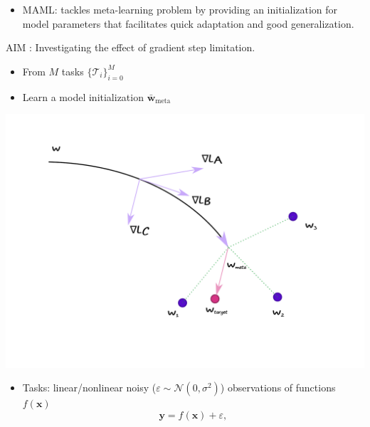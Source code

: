 \documentclass[a0paper,portrait]{baposter}
\begin{document}
\begin{poster}
{\begin{itemize}
    \color{Pink}\item \color{Black} MAML: tackles meta-learning problem by providing an initialization for model parameters that facilitates quick adaptation and good generalization.
  \end{itemize}
  \centering 
  \color{Pink} AIM : \color{Black} Investigating the effect of gradient step limitation.

}

{
  \begin{itemize}
    \color{Pink} \item \color{Black} From $M$ tasks $\{\mathcal{T}_i\}_{i=0}^{M}$
    \color{Pink} \item \color{Black} Learn a model initialization $\bar{\mathbf{w}}_{\text{meta}}$
  \end{itemize}
  \includegraphics[width=\textwidth]{figures/maml}
}

{
  \begin{itemize}
    \color{Pink} \item \color{Black} Tasks: linear/nonlinear noisy ($\varepsilon  \sim \mathcal{N}(0, \sigma^2)$) observations of functions $f(\mathbf{x})$
      \begin{equation}\label{eq:task}
    \mathbf{y}= f(\mathbf{x})+\varepsilon, 
  \end{equation}  


\end{itemize}}
\end{poster}
\end{document}
